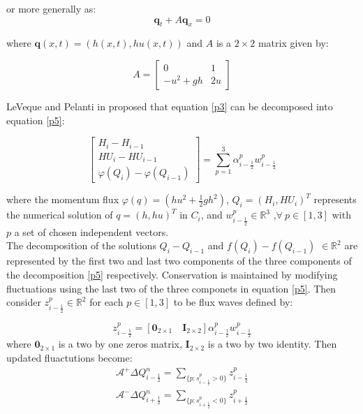 \documentclass[12pt,a4paper]{article}
\begin{document}
	\noindent or more generally as:
	\begin{equation}
		\mathbf q_t + A \mathbf q_x = 0
	\end{equation}
	
	\noindent where $\mathbf q(x,t) = (h(x,t), hu(x,t))$ and $A$ is a $2 \times 2$ matrix given by:
	
	\begin{equation}
		A = \begin{bmatrix} 0 &  1 \\ -u^{2} + gh & 2u \end{bmatrix}
	\end{equation}
	
	\noindent LeVeque and Pelanti in \cite{leveque2001class} proposed that equation \eqref{p3} can be decomposed into equation \eqref{p5}:
	
	\begin{equation}
				\begin{bmatrix} 
					H_{i} - H_{i-1}\\ 	HU_{i} - HU_{i-1} \\  \varphi(Q_{i}) - \varphi(Q_{i-1}) 
				\end{bmatrix} = \sum_{p=1}^{3} \alpha_{i-\frac{1}{2}}^{p} w_{i-\frac{1}{2}}^{p}
			\label{p5}
	\end{equation}

	\noindent where the momentum flux $\varphi(q) = (hu^{2} + \frac{1}{2} gh^{2})$, $Q_{i} = (H_{i},HU_{i})^{T}$ represents the numerical solution of $q = (h,hu)^{T}$ in $C_{i}$, and $w_{i-\frac{1}{2}}^{p} \in \mathbb{R}^{3}$ ,$\forall ~ p \in [1,3] $ with $p$ a set of chosen independent vectors. \\
	
	\noindent The decomposition of the solutions $Q_{i} - Q_{i-1} $  and  $f(Q_{i}) - f(Q_{i-1})$ $ \in  \mathbb{R}^{2}$ are represented by the first two and last two components of the three components of the decomposition \eqref{p5} respectively.  Conservation is maintained by modifying fluctuations using the last two of the three componets  in equation \eqref{p5}. Then  consider $z_{i-\frac{1}{2}}^{p} \in \mathbb{R}^{2}$ for each $p \in [1,3]$ to be flux waves defined by:
	
	\begin{equation}
		z_{i-\frac{1}{2}}^{p} = [\mathbf{0}_{2\times1} \quad \mathbf{I}_{2\times2}] \alpha_{i-\frac{1}{2}}^{p} w_{i-\frac{1}{2}}^{p}
	\end{equation}
	where $\mathbf{0}_{2\times1}$ is a two by one zeros matrix, $\mathbf{I}_{2\times2}$ is a two by two identity. Then updated fluactutions become:
 	\begin{eqnarray}
		\mathcal{A^{+}}\Delta Q_{i-\frac{1}{2}}^{n} = \sum_{\{ p:s_{i-\frac{1}{2}}^{p}>0\}}  z_{i-\frac{1}{2}}^{p}
		\label{p7}\\
		\mathcal{A^{-}}\Delta Q_{i+\frac{1}{2}}^{n} = \sum_{\{ p:s_{i+\frac{1}{2}}^{p}<0\}} z_{i+\frac{1}{2}}^{p}
		\label{p8}
	\end{eqnarray}
\end{document}
